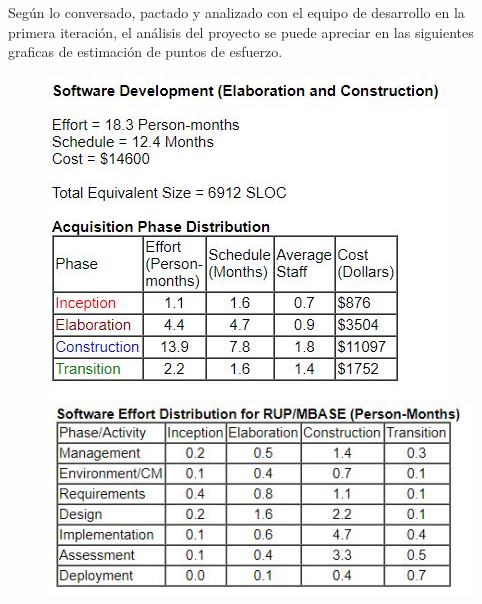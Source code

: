 Según lo conversado, pactado y analizado con el equipo de desarrollo en la primera iteración, el análisis del proyecto se puede apreciar en las siguientes graficas de estimación de puntos de esfuerzo.
\begin{figure}[htbp]
	\includegraphics{imgs/1.JPG}
	\includegraphics[scale=0.9]{imgs/2.JPG}
\end{figure}

